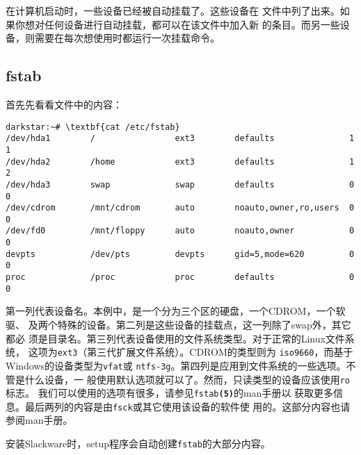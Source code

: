 在计算机启动时，一些设备已经被自动挂载了。这些设备在
文件中列了出来。如果你想对任何设备进行自动挂载，都可以在该文件中加入新
的条目。而另一些设备，则需要在每次想使用时都运行一次挂载命令。

\subsection{fstab}
\label{sec:filesystemStructure:mouting:fstab}
首先先看看文件中的内容：
\begin{Verbatim}[frame=single, commandchars=\\\{\}]
darkstar:~# \textbf{cat /etc/fstab}
/dev/hda1        /                ext3        defaults               1   1
/dev/hda2        /home            ext3        defaults               1   2
/dev/hda3        swap             swap        defaults               0   0
/dev/cdrom       /mnt/cdrom       auto        noauto,owner,ro,users  0   0
/dev/fd0         /mnt/floppy      auto        noauto,owner           0   0
devpts           /dev/pts         devpts      gid=5,mode=620         0   0
proc             /proc            proc        defaults               0   0
\end{Verbatim}

第一列代表设备名。本例中，是一个分为三个区的硬盘，一个CDROM，一个软驱、
及两个特殊的设备。第二列是这些设备的挂载点，这一列除了swap外，其它都必
须是目录名。第三列代表设备使用的文件系统类型。对于正常的Linux文件系统，
这项为\texttt{ext3}（第三代扩展文件系统）。CDROM的类型则为
\texttt{iso9660}，而基于Windows的设备类型为\texttt{vfat}或
\texttt{ntfs-3g}。第四列是应用到文件系统的一些选项。不管是什么设备，一
般使用默认选项就可以了。然而，只读类型的设备应该使用\texttt{ro}标志。
我们可以使用的选项有很多，请参见\texttt{fstab\textbf{(5)}}的man手册以
获取更多信息。最后两列的内容是由\texttt{fsck}或其它使用该设备的软件使
用的。这部分内容也请参阅man手册。

安装Slackware时，setup程序会自动创建\texttt{fstab}的大部分内容。

